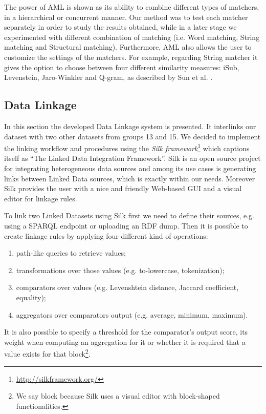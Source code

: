 \documentclass[runningheads,a4paper]{../../StyleFiles/llncs}
\begin{document}
The power of AML is shown as its ability to combine different types of matchers, in a hierarchical or concurrent manner. Our method was to test each matcher separately in order to study the results obtained, while in a later stage we experimented with different combination of matching (i.e. Word matching, String matching and Structural matching). Furthermore, AML also allows the user to customize the settings of the matchers. For example, regarding String matcher it gives the option to choose between four different similarity measures: iSub, Levenstein, Jaro-Winkler and Q-gram, as described by Sun et al. \cite{sun2015comparative}.

\subsection{Data Linkage}
In this section the developed Data Linkage system is presented.
It interlinks our dataset with two other datasets from groups 13 and 15. We
decided to implement the linking workflow and procedures using the
\textit{Silk framework}\footnote{\url{http://silkframework.org/}} which captions
itself as ``The Linked Data Integration Framework''. Silk is an open source
project for integrating heterogeneous data sources and among its use cases is
generating links between Linked Data sources, which is exactly within our needs.
Moreover Silk provides the user with a nice and friendly Web-based GUI and a visual
editor for linkage rules.

To link two Linked Datasets using Silk first we need to define their sources,
e.g. using a SPARQL endpoint or uploading an RDF dump. Then it is possible to
create linkage rules by applying four different kind of operations:
\begin{enumerate}
	\item path-like queries to retrieve values;
	\item transformations over those values (e.g. to-lowercase, tokenization);
	\item comparators over values (e.g. Levenshtein distance, Jaccard
		coefficient, equality);
	\item aggregators over comparators output (e.g. average, minimum, maximum).
\end{enumerate}
It is also possible to specify a threshold for the comparator's output score,
its weight when computing an aggregation for it or whether it is required that a
value exists for that block\footnote{We say block because Silk uses a visual
editor with block-shaped functionalities.}.
\end{document}
